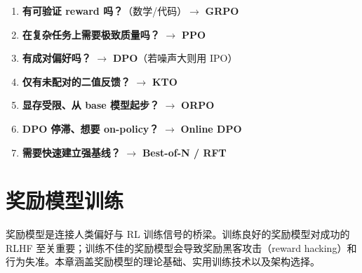 \begin{keybox}
\begin{enumerate}
  \item \textbf{有可验证 reward 吗？}（数学/代码）$\rightarrow$ \textbf{GRPO}
  \item \textbf{在复杂任务上需要极致质量吗？} $\rightarrow$ \textbf{PPO}
  \item \textbf{有成对偏好吗？} $\rightarrow$ \textbf{DPO}（若噪声大则用 IPO）
  \item \textbf{仅有未配对的二值反馈？} $\rightarrow$ \textbf{KTO}
  \item \textbf{显存受限、从 base 模型起步？} $\rightarrow$ \textbf{ORPO}
  \item \textbf{DPO 停滞、想要 on-policy？} $\rightarrow$ \textbf{Online DPO}
  \item \textbf{需要快速建立强基线？} $\rightarrow$ \textbf{Best-of-N / RFT}
\end{enumerate}
\end{keybox}

\chapter{奖励模型训练}
\label{sec:reward-models}

奖励模型是连接人类偏好与 RL 训练信号的桥梁。训练良好的奖励模型对成功的 RLHF 至关重要；训练不佳的奖励模型会导致奖励黑客攻击（reward hacking）和行为失准。本章涵盖奖励模型的理论基础、实用训练技术以及架构选择。

